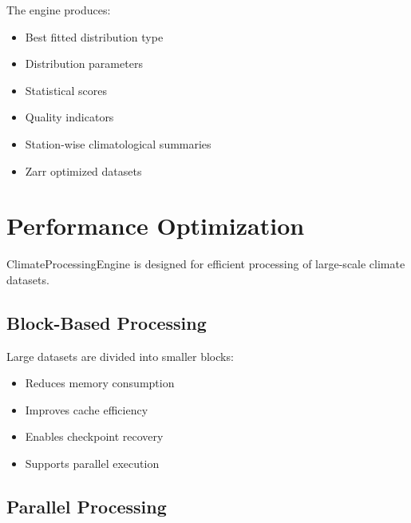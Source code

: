 \documentclass[11pt,a4paper]{article}
\begin{document}
The engine produces:


\begin{itemize}


\item Best fitted distribution type

\item Distribution parameters

\item Statistical scores

\item Quality indicators

\item Station-wise climatological summaries

\item Zarr optimized datasets


\end{itemize}
\section{Performance Optimization}



ClimateProcessingEngine is designed for efficient processing of
large-scale climate datasets.



\subsection{Block-Based Processing}



Large datasets are divided into smaller blocks:


\begin{itemize}

\item Reduces memory consumption

\item Improves cache efficiency

\item Enables checkpoint recovery

\item Supports parallel execution

\end{itemize}



\subsection{Parallel Processing}
\end{document}
